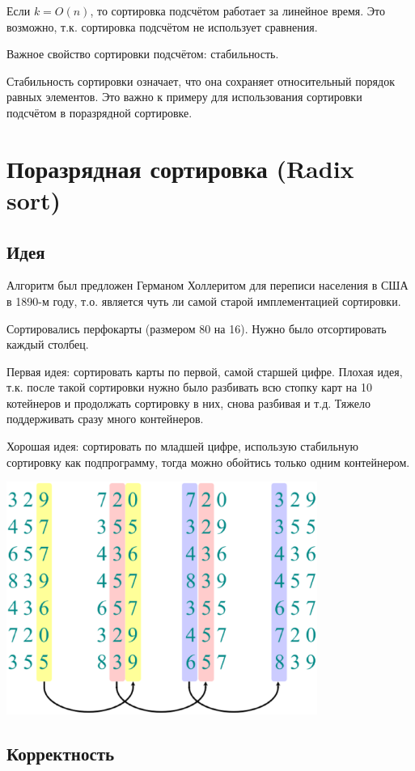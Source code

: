 \documentclass[a4paper,11pt]{article}
\begin{document}
Если $k = O(n)$, то сортировка подсчётом работает за линейное время.
Это возможно, т.к. сортировка подсчётом не использует сравнения.

Важное свойство сортировки подсчётом: стабильность.

Стабильность сортировки означает, что она сохраняет относительный порядок равных
элементов. Это важно к примеру для использования сортировки подсчётом в
поразрядной сортировке.

\section{Поразрядная сортировка (Radix sort)}

\subsection{Идея}
Алгоритм был предложен Германом Холлеритом для переписи населения в США в 
1890-м году, т.о. является чуть ли самой старой имплементацией сортировки.

Сортировались перфокарты (размером 80 на 16). Нужно было отсортировать каждый
столбец.

Первая идея: сортировать карты по первой, самой старшей цифре. Плохая идея, т.к.
после такой сортировки нужно было разбивать всю стопку карт на 10 котейнеров и
продолжать сортировку в них, снова разбивая и т.д. Тяжело поддерживать сразу
много контейнеров.

Хорошая идея: сортировать по младшей цифре, использую стабильную сортировку как
подпрограмму, тогда можно обойтись только одним контейнером.

\includegraphics[width=4in]{lecture5/radix-example.eps}

\subsection{Корректность}
\end{document}
